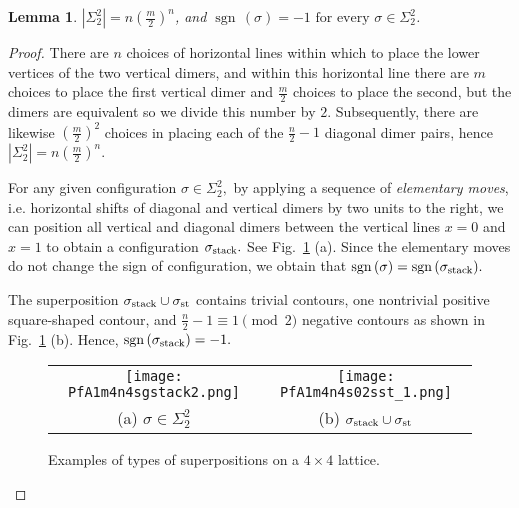 \documentclass[12pt,reqno]{amsart}
\numberwithin{equation}{section}
\newcommand{\sg}{\sigma}
\newcommand{\sgn}{{\operatorname{sgn}\,}}
\newtheorem{lem}[theo]{{\sc \bf Lemma}}
\begin{document}
\begin{lem}\label{lem44.4}
$|\Sigma_2^2|=n\left(\frac{m}{2}\right)^n$, and $\sgn(\sigma)=-1\text{ for every }\sg\in\Sigma_2^2$.
\end{lem}
\begin{proof}
There are $n$ choices of horizontal lines within which to place the lower vertices of the two vertical dimers, and within this horizontal line there are $m$ choices to place the first vertical dimer and $\frac{m}{2}$ choices to place the second, but the dimers are equivalent so we divide this number by $2$. Subsequently, there are likewise $\left(\frac{m}{2}\right)^2$ choices in placing each of the $\frac{n}{2}-1$ diagonal dimer pairs, hence $|\Sigma_2^2|=n\left(\frac{m}{2}\right)^n$.

For any given configuration $\sg\in\Sigma_2^2,$ by applying  a sequence of 
{\it elementary moves}, i.e. horizontal shifts of diagonal and vertical dimers by two units to the right, we can position all vertical and diagonal dimers between the vertical lines $x=0$ and $x=1$ to obtain a configuration $\sg_{\rm stack}.$ See Fig.\ 
\ref{F4} (a). Since the elementary moves do not change the sign of configuration, 
we obtain that $\sgn(\sg)=\sgn(\sg_{\rm stack}).$ 

The superposition $\sg_{\rm stack}\cup\sg_{\textrm{st}}$ contains trivial contours, one nontrivial positive square-shaped contour, and $\frac{n}{2}-1\equiv 1\pmod 2$ negative contours as shown in Fig.\ \ref{F4} (b). Hence, $\sgn(\sigma_{\rm stack})=-1.$

\begin{figure}[h]
\begin{tabular}{c c}
\texttt{[image: PfA1m4n4sgstack2.png]}&\hspace{.5in} 
\texttt{[image: PfA1m4n4s02sst\_1.png]}\\
(a) $\sg\in \Sigma_2^2$ &\hspace{.5in} 
(b) $\sg_{\rm stack}\cup\sg_{\textrm{st}}$ 
\end{tabular}
\caption{Examples of types of superpositions on a $4\times 4$ lattice.}
\label{F4}
\end{figure}
\end{proof}
\end{document}
